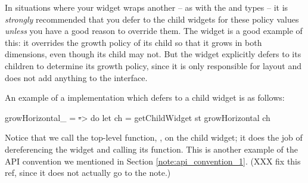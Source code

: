 In situations where your widget wraps another -- as with the 
and  types -- it is \textit{strongly} recommended that
you defer to the child widgets for these policy values \textit{unless}
you have a good reason to override them.  The  widget is
a good example of this: it overrides the growth policy of its child so
that it grows in both dimensions, even though its child may not.  But
the  widget explicitly defers to its children to determine its
growth policy, since it is only responsible for layout and does not
add anything to the interface.

An example of a  implementation which defers to a
child widget is as follows:

\begin{haskellcode}
 growHorizontal_ = \st -> do
   let ch = getChildWidget st
   growHorizontal ch
\end{haskellcode}

Notice that we call the top-level function, , on
the child widget; it does the job of dereferencing the widget and
calling its  function.  This is another example
of the API convention we mentioned in Section
\ref{note:api_convention_1}. (XXX fix this ref, since it does not
actually go to the note.)
